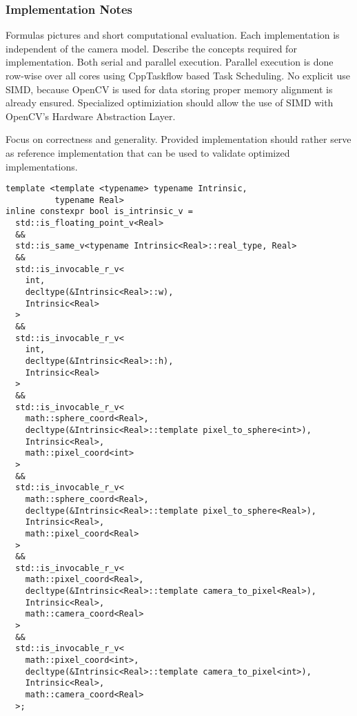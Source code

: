 \subsubsection{Implementation Notes}

Formulas pictures and short computational evaluation.
Each implementation is independent of the camera model.
Describe the concepts required for implementation.
Both serial and parallel execution.
Parallel execution is done row-wise over all cores using CppTaskflow based Task Scheduling.
No explicit use SIMD, because OpenCV\cite{opencv_library} is used for data storing proper memory alignment is already ensured.
Specialized optimiziation should allow the use of SIMD with OpenCV's Hardware Abstraction Layer.

Focus on correctness and generality.
Provided implementation should rather serve as reference implementation that can be used to validate optimized implementations.

\begin{lstlisting}
template <template <typename> typename Intrinsic,
          typename Real>
inline constexpr bool is_intrinsic_v =
  std::is_floating_point_v<Real>
  &&
  std::is_same_v<typename Intrinsic<Real>::real_type, Real>
  &&
  std::is_invocable_r_v<
    int,
    decltype(&Intrinsic<Real>::w),
    Intrinsic<Real>
  >
  &&
  std::is_invocable_r_v<
    int,
    decltype(&Intrinsic<Real>::h),
    Intrinsic<Real>
  >
  &&
  std::is_invocable_r_v<
    math::sphere_coord<Real>,
    decltype(&Intrinsic<Real>::template pixel_to_sphere<int>),
    Intrinsic<Real>,
    math::pixel_coord<int>
  >
  &&
  std::is_invocable_r_v<
    math::sphere_coord<Real>,
    decltype(&Intrinsic<Real>::template pixel_to_sphere<Real>),
    Intrinsic<Real>,
    math::pixel_coord<Real>
  >
  &&
  std::is_invocable_r_v<
    math::pixel_coord<Real>,
    decltype(&Intrinsic<Real>::template camera_to_pixel<Real>),
    Intrinsic<Real>,
    math::camera_coord<Real>
  >
  &&
  std::is_invocable_r_v<
    math::pixel_coord<int>,
    decltype(&Intrinsic<Real>::template camera_to_pixel<int>),
    Intrinsic<Real>,
    math::camera_coord<Real>
  >;
\end{lstlisting}


